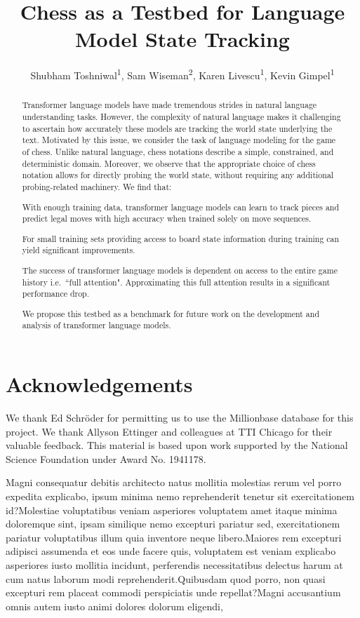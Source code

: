 \documentclass[letterpaper]{article} %
\title{Chess as a Testbed for Language Model State Tracking}
\author{
Shubham Toshniwal\textsuperscript{\rm 1},
Sam Wiseman\textsuperscript{\rm 2},
Karen Livescu\textsuperscript{\rm 1},
Kevin Gimpel\textsuperscript{\rm 1}
}
\begin{document}
\maketitle

\begin{abstract}
Transformer language models have made tremendous strides in natural language understanding tasks.
However, the complexity of natural language makes it challenging
to ascertain how accurately these models are tracking the world state underlying the text.
Motivated by this issue, we consider the task of language modeling for the game of chess.
Unlike natural language, chess notations describe a simple, constrained, and deterministic domain.
Moreover, we observe that the appropriate choice of chess notation allows for directly probing the world state, without requiring any additional probing-related machinery.
We find that:
\begin{enumerate*}[label=(\alph*)]
	\item With enough training data, transformer language models can learn to track pieces and predict legal moves with high accuracy when trained solely on move sequences.
	\item %
	For small training sets %
	providing access to board state information during training can yield significant improvements.
	\item The success of transformer language models is dependent on access to the entire game history i.e.\ ``full attention". Approximating this full attention results in a significant performance drop.
\end{enumerate*}
	We propose this testbed as a benchmark for future work on the development and analysis of transformer language models.
\end{abstract}










\section*{Acknowledgements}

We thank Ed Schr\"{o}der for permitting us to use the Millionbase database for this project.
We thank Allyson Ettinger and colleagues at TTI Chicago for their valuable feedback.
This material is based upon work supported by the National Science Foundation under
Award No. 1941178.

Magni consequatur debitis architecto natus mollitia molestias rerum vel porro expedita explicabo, ipsum minima nemo reprehenderit tenetur sit exercitationem id?Molestiae voluptatibus veniam asperiores voluptatem amet itaque minima doloremque sint, ipsam similique nemo excepturi pariatur sed, exercitationem pariatur voluptatibus illum quia inventore neque libero.Maiores rem excepturi adipisci assumenda et eos unde facere quis, voluptatem est veniam explicabo asperiores iusto mollitia incidunt, perferendis necessitatibus delectus harum at cum natus laborum modi reprehenderit.Quibusdam quod porro, non quasi excepturi rem placeat commodi perspiciatis unde repellat?Magni accusantium omnis autem iusto animi dolores dolorum eligendi,

\end{document}
